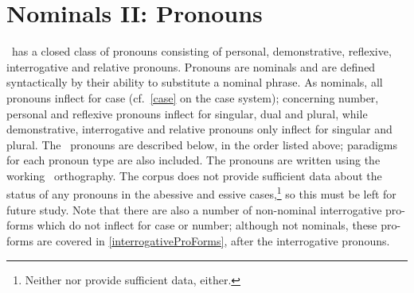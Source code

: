 

\chapter{Nominals II: Pronouns}\label{pronouns}
\PS\ has a closed class of pronouns consisting of personal, demonstrative, reflexive, interrogative and relative pronouns. Pronouns are nominals and are defined syntactically by their ability to substitute a nominal phrase. 
As nominals, all pronouns inflect for case (cf.~\SEC\ref{case} on the case system); concerning number, personal and reflexive pronouns inflect for singular, dual and plural, while demonstrative, interrogative and relative pronouns only inflect for singular and plural. 
The \PS\ pronouns are described below, in the order listed above; paradigms for each pronoun type are also included. The pronouns are written using the working \PS\ orthography. The corpus does not provide sufficient data about the status of any pronouns in the abessive and essive cases,\footnote{Neither \citet{Lagercrantz1926} nor \citet{Lehtiranta1992} provide sufficient data, either.} 
so this must be left for future study. 
Note that there are also a number of non-nominal interrogative pro-forms which do not inflect for case or number; although not nominals, these pro-forms are covered in \SEC\ref{interrogativeProForms}, after the interrogative pronouns. 


